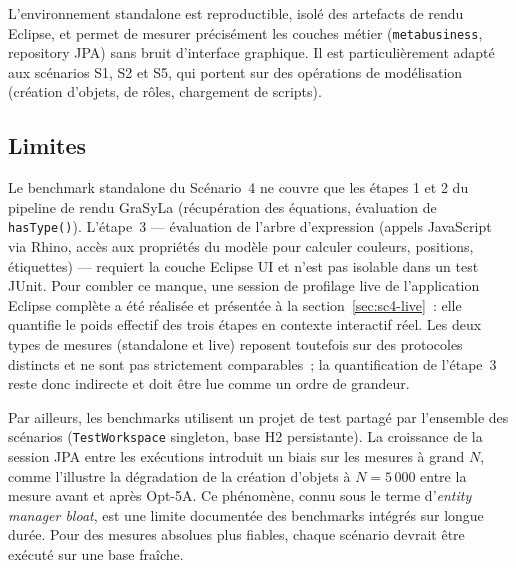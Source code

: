 L'environnement standalone est reproductible, isolé des artefacts de rendu Eclipse, et permet de mesurer précisément les couches métier (\texttt{metabusiness}, repository JPA) sans bruit d'interface graphique. Il est particulièrement adapté aux scénarios S1, S2 et S5, qui portent sur des opérations de modélisation (création d'objets, de rôles, chargement de scripts).

\subsection*{Limites}

Le benchmark standalone du Scénario~4 ne couvre que les étapes 1 et 2 du pipeline de rendu GraSyLa (récupération des équations, évaluation de \texttt{hasType()}). L'étape~3 --- évaluation de l'arbre d'expression (appels JavaScript via Rhino, accès aux propriétés du modèle pour calculer couleurs, positions, étiquettes) --- requiert la couche Eclipse UI et n'est pas isolable dans un test JUnit. Pour combler ce manque, une session de profilage live de l'application Eclipse complète a été réalisée et présentée à la section~\ref{sec:sc4-live}~: elle quantifie le poids effectif des trois étapes en contexte interactif réel. Les deux types de mesures (standalone et live) reposent toutefois sur des protocoles distincts et ne sont pas strictement comparables~; la quantification de l'étape~3 reste donc indirecte et doit être lue comme un ordre de grandeur.

Par ailleurs, les benchmarks utilisent un projet de test partagé par l'ensemble des scénarios (\texttt{TestWorkspace} singleton, base H2 persistante). La croissance de la session JPA entre les exécutions introduit un biais sur les mesures à grand $N$, comme l'illustre la dégradation de la création d'objets à $N = 5\,000$ entre la mesure avant et après Opt-5A. Ce phénomène, connu sous le terme d'\emph{entity manager bloat}, est une limite documentée des benchmarks intégrés sur longue durée. Pour des mesures absolues plus fiables, chaque scénario devrait être exécuté sur une base fraîche.

